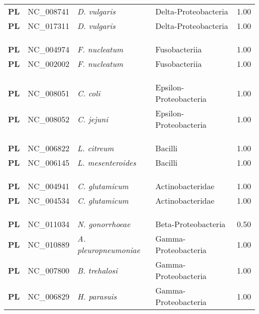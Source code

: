 \begin{adjustwidth}{-3cm}{2cm}
{\begin{supertabular}{>{\bfseries}l|p{0.1\textwidth}p{0.14\textwidth}l|l}
PL & NC\_008741 & \textit{D. vulgaris} & Delta-Proteobacteria & 1.00\\
PL & NC\_017311 & \textit{D. vulgaris} & Delta-Proteobacteria & 1.00\\
\\
\\
\hline\\
PL & NC\_004974 & \textit{F. nucleatum} & Fusobacteriia & 1.00\\
PL & NC\_002002 & \textit{F. nucleatum} & Fusobacteriia & 1.00\\
\\
\\
\hline\\
PL & NC\_008051 & \textit{C. coli} & Epsilon-Proteobacteria & 1.00\\
PL & NC\_008052 & \textit{C. jejuni} & Epsilon-Proteobacteria & 1.00\\
\\
\\
\hline\\
PL & NC\_006822 & \textit{L. citreum} & Bacilli & 1.00\\
PL & NC\_006145 & \textit{L. mesenteroides} & Bacilli & 1.00\\
\\
\\
\hline\\
PL & NC\_004941 & \textit{C. glutamicum} & Actinobacteridae & 1.00\\
PL & NC\_004534 & \textit{C. glutamicum} & Actinobacteridae & 1.00\\
\\
\\
\hline\\
PL & NC\_011034 & \textit{N. gonorrhoeae} & Beta-Proteobacteria & 0.50\\
PL & NC\_010889 & \textit{A. pleuropneumoniae} & Gamma-Proteobacteria & 1.00\\
PL & NC\_007800 & \textit{B. trehalosi} & Gamma-Proteobacteria & 1.00\\
PL & NC\_006829 & \textit{H. parasuis} & Gamma-Proteobacteria & 1.00\\

\end{supertabular}}
\end{adjustwidth}
